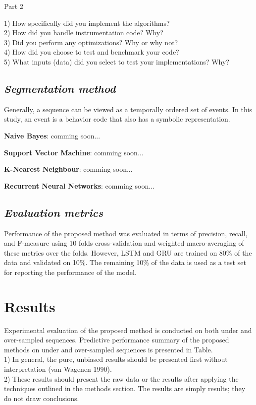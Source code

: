 \documentclass{amia}
\begin{document}
Part 2

1) How specifically did you implement the algorithms?\\
2) How did you handle instrumentation code? Why?\\
3) Did you perform any optimizations? Why or why not?\\
4) How did you choose to test and benchmark your code?\\
5) What inputs (data) did you select to test your implementations? Why?\\

\subsection*{\textit{Segmentation method}}
Generally, a sequence can be viewed as a temporally ordered set of events. In this study, an event is a behavior code that also has a symbolic representation.

\textbf{Naive Bayes}: comming soon...

\textbf{Support Vector Machine}: comming soon...

\textbf{K-Nearest Neighbour}: comming soon...

\textbf{Recurrent Neural Networks}: comming soon...
  
\subsection*{\textit{Evaluation metrics}}
Performance of the proposed method was evaluated in terms of precision, recall, and F-measure using 10 folds cross-validation and weighted macro-averaging of these metrics over the folds. However, LSTM and GRU are trained on 80\% of the data and validated on 10\%. The remaining 10\% of the data is used as a test set for reporting the performance of the model. 

\section*{Results}
Experimental evaluation of the proposed method is conducted on both under and over-sampled sequences. Predictive performance summary of the proposed methods on under and over-sampled sequences is presented in Table.\\

1) In general, the pure, unbiased results should be presented first without interpretation (van Wagenen 1990). \\
2) These results should present the raw data
or the results after applying the techniques outlined in the methods section. The results are simply results; they do not draw conclusions.
\end{document}
